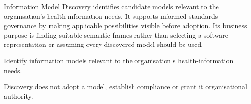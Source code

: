 Information Model Discovery identifies candidate models relevant to the organisation's health-information needs. It supports informed standards governance by making applicable possibilities visible before adoption. Its business purpose is finding suitable semantic frames rather than selecting a software representation or assuming every discovered model should be used.



Identify information models relevant to the organisation’s health-information needs.



Discovery does not adopt a model, establish compliance or grant it organisational authority.


